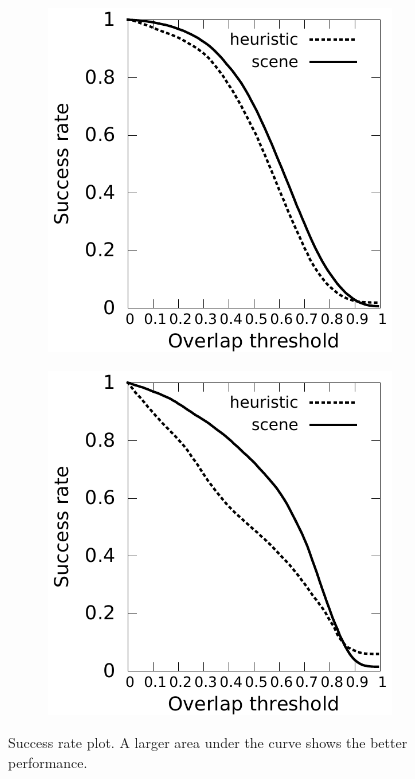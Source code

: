 \begin{figure}
    \centering
     \centering
     \begin{subfigure}{0.48\linewidth}
    \includegraphics[width=\linewidth]{./img/semantic_tracker/exp/success_lowRes.pdf}
    \end{subfigure}
    \begin{subfigure}{0.48\linewidth}
    \includegraphics[width=\linewidth]{./img/semantic_tracker/exp/success_highRes.pdf}
    \end{subfigure}
    \caption{Success rate plot. A larger area under the curve shows the better performance.}
    \label{fig:semantic-eval-success}
\end{figure}